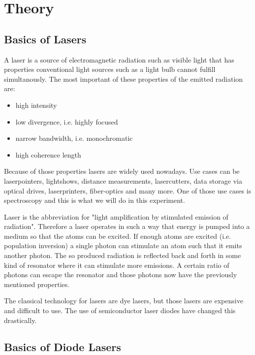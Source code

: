\section{Theory}
\label{sec:Theory}

\subsection{Basics of Lasers}
\label{ssec:laser_basics}

A laser is a source of electromagnetic radiation such as visible light that has properties conventional light sources such as a light bulb cannot fulfill simultanously.
The most important of these properties of the emitted radiation are: 
\begin{itemize}
    \item high intensity
    \item low divergence, i.e. highly focused
    \item narrow bandwidth, i.e. monochromatic
    \item high coherence length
\end{itemize}

Because of those properties lasers are widely used nowadays. 
Use cases can be laserpointers, lightshows, distance measurements, lasercutters, data storage via optical drives, laserprinters, fiber-optics and many more.
One of those use cases is spectroscopy and this is what we will do in this experiment.

Laser is the abbreviation for "light amplification by stimulated emission of radiation".
Therefore a laser operates in such a way that energy is pumped into a medium so that the atoms can be excited.
If enough atoms are excited (i.e. population inversion) a single photon can stimulate an atom such that it emits another photon.
The so produced radiation is reflected back and forth in some kind of resonator where it can stimulate more emissions.
A certain ratio of photons can escape the resonator and those photons now have the previously mentioned properties.

The classical technology for lasers are dye lasers, but those lasers are expensive and difficult to use.
The use of semiconductor laser diodes have changed this drastically.

\subsection{Basics of Diode Lasers}
\label{ssec:diode_laser_basics}

